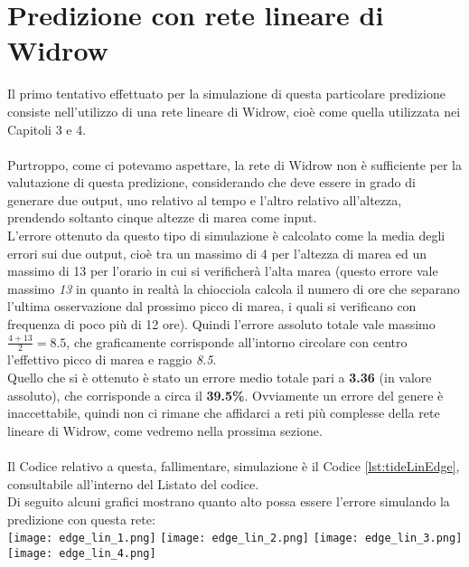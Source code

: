 	\section{Predizione con rete lineare di Widrow}
		Il primo tentativo effettuato per la simulazione di questa particolare predizione consiste nell'utilizzo di una rete lineare di Widrow, cioè come quella utilizzata nei Capitoli 3 e 4.\\
		\\
		Purtroppo, come ci potevamo aspettare, la rete di Widrow non è sufficiente per la valutazione di questa predizione, considerando che deve essere in grado di generare due output, uno relativo al tempo e l'altro relativo all'altezza, prendendo soltanto cinque altezze di marea come input.\\
		L'errore ottenuto da questo tipo di simulazione è calcolato come la media degli errori sui due output, cioè tra un massimo di 4 per l'altezza di marea ed un massimo di 13 per l'orario in cui si verificherà l'alta marea (questo errore vale massimo \textit{13} in quanto in realtà la chiocciola calcola il numero di ore che separano l'ultima osservazione dal prossimo picco di marea, i quali si verificano con frequenza di poco più di 12 ore). Quindi l'errore assoluto totale vale massimo \(\frac{4+13}{2} = 8.5\), che graficamente corrisponde all'intorno circolare con centro l'effettivo picco di marea e raggio \textit{8.5}.\\
		Quello che si è ottenuto è stato un errore medio totale pari a \textbf{3.36} (in valore assoluto), che corrisponde a circa il \textbf{39.5\%}. Ovviamente un errore del genere è inaccettabile, quindi non ci rimane che affidarci a reti più complesse della rete lineare di Widrow, come vedremo nella prossima sezione.\\
		\\
		Il Codice relativo a questa, fallimentare, simulazione è il Codice \ref{lst:tideLinEdge}, consultabile all'interno del Listato del codice.\\
		Di seguito alcuni grafici mostrano quanto alto possa essere l'errore simulando la predizione con questa rete:\\
		\texttt{[image: edge\_lin\_1.png]}
		\texttt{[image: edge\_lin\_2.png]}
		\texttt{[image: edge\_lin\_3.png]}
		\texttt{[image: edge\_lin\_4.png]}
		\FloatBarrier
		
